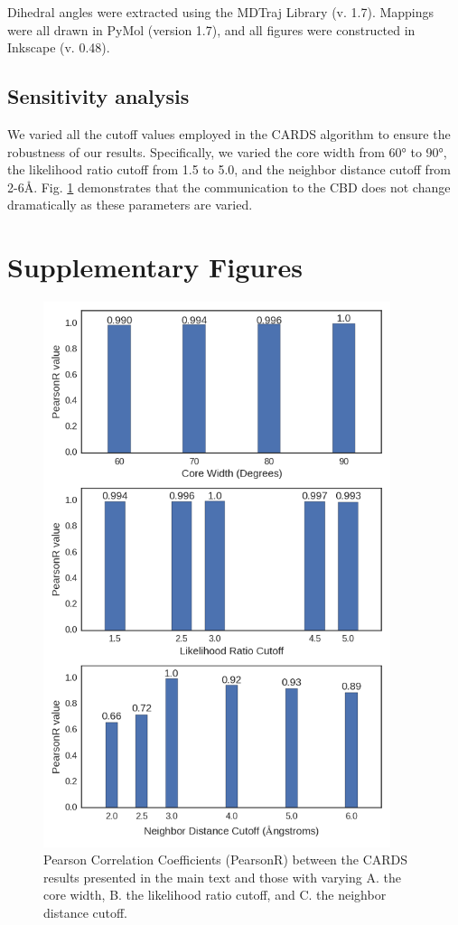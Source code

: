 \documentclass[../main.tex]{subfiles}
\begin{document}
        Dihedral angles were extracted using the MDTraj Library\cite{McGibbon:2015fv} (v. 1.7). Mappings were all drawn in PyMol (version 1.7)\cite{DeLano:2010wf}, and all figures were constructed in Inkscape (v. 0.48). 

    \subsection{Sensitivity analysis}
        We varied all the cutoff values employed in the CARDS algorithm to ensure the robustness of our results. Specifically, we varied the core width from 60° to 90°, the likelihood ratio cutoff from 1.5 to 5.0, and the neighbor distance cutoff from 2-6\AA. Fig. \ref{fig:cards-pearsonr-fig} demonstrates that the communication to the CBD does not change dramatically as these parameters are varied.

\section{Supplementary Figures}

    \begin{figure}[!htb] %
        \centering
        \includegraphics[width=4in]{suppfig1-pearsonr.png}
        \caption[CARDS sensitivity analysis]{Pearson Correlation Coefficients (PearsonR) between the CARDS results presented in the main text and those with varying A. the core width, B. the likelihood ratio cutoff, and C. the neighbor distance cutoff.}
        \label{fig:cards-pearsonr-fig}
    \end{figure} 
\end{document}
